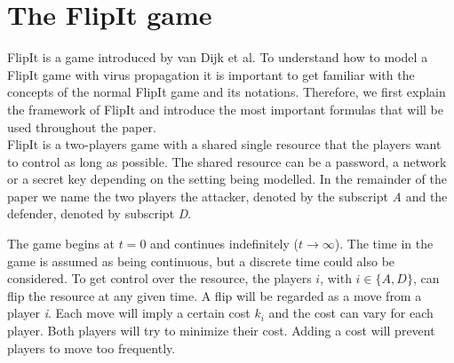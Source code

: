 



\section{The FlipIt game}
\label{cha1:FlipItGame}
FlipIt is a game introduced by van Dijk et al. To understand how to model a FlipIt game with virus propagation it is important to get familiar with the concepts of the normal FlipIt game and its notations.  Therefore, we first explain the framework of FlipIt and introduce the most important formulas that will be used throughout the paper. \\

FlipIt is a two-players game with a shared single resource that the players want to control as long as possible. The shared resource can be a password, a network or a secret key depending on the setting being modelled. In the remainder of the paper we name the two players the attacker, denoted by the subscript \textit{A} and the defender, denoted by subscript \textit{D}. 

The game begins at $t=0$ and continues indefinitely ($t \rightarrow \infty $). The time in the game is assumed as being continuous, but a discrete time could also be considered. To get control over the resource, the players $i$, with $i \in \{A,D\}$, can flip the resource at any given time. A flip will be regarded as a move from a player \textit{i}. Each move will imply a certain cost $k_{i}$ and the cost can vary for each player. Both players will try to minimize their cost. Adding a cost will prevent players to move too frequently. \\

